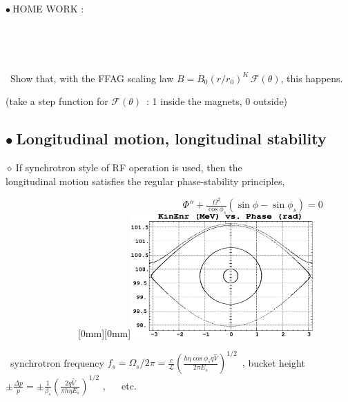 \documentclass[12pt]{article}
\newcommand{\nib}{\noindent \ensuremath{\bullet~}}
\newcommand{\nid}{\noindent \ensuremath{\diamond~}}
\newcommand{\nin}{\noindent~}
\newcommand{\blue}{\color{blue}}
\begin{document}
\clearpage

{\blue 

\fontsize{30}{36} \selectfont

\nib HOME WORK : 

~

~

\nin Show that, with the FFAG scaling law $B=B_0 (r/r_0)^K \, \mathcal{F}(\theta)$, 
this happens.

(take a step function for $\mathcal{F}(\theta)$~: 1 inside the magnets, 0 outside)
}

\clearpage


{\fontsize{18}{34} \selectfont

\subsection*{\LARGE \nib  Longitudinal motion, longitudinal stability}



\nid  If  synchrotron style of RF operation is used, then the \\
longitudinal motion satisfies the regular phase-stability principles, 

\medskip
{\Large ~ ~ ~ ~ ~ ~ ~ ~ ~ ~ ~ ~ ~ ~ ~  ~ ~ ~ ~ ~ ~ ~  %
$ \Phi'' + \frac{\Omega^2}{\cos{\phi_s}}(\sin\phi - \sin \phi_s)=0$}
~ ~ ~ ~ ~ ~ ~ ~ ~ ~ ~ ~ 
\raisebox{-3mm}[0mm][0mm]{\includegraphics*[bbllx=20,bblly=100,bburx=560,bbury=460,width=7cm]{./figs_FFAG_introSlides/synMot100MeV.eps}}

\medskip
\nin synchrotron frequency {\Large $f_s = \Omega_s/2\pi = \frac{c}{\mathcal{L}}\left( 
\frac{h \eta  \cos\phi_s q\hat{V}}{2 \pi E_s}\right)^{1/2}$~, } 
 bucket height  {\Large $\pm \frac{\Delta p}{p} = \pm \frac{1}{\beta_s} 
\left(\frac{ 2 q\hat{V}}{\pi h \eta E_s}\right)^{1/2}$ ,}      ~~  etc.



}
\end{document}
